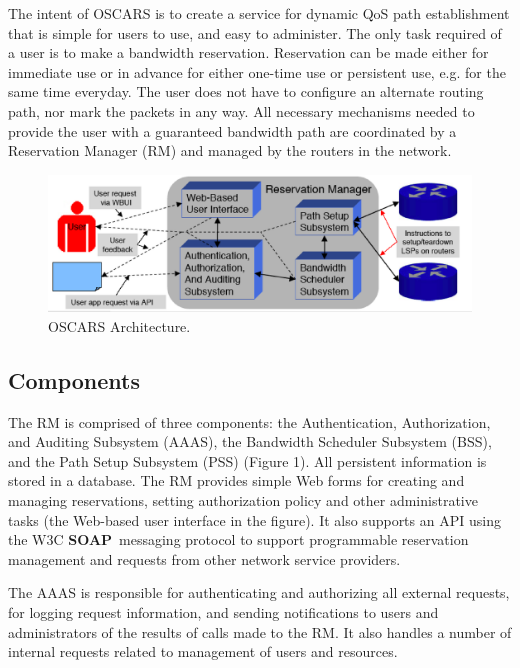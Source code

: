 \documentclass[conference]{IEEEtran}
\begin{document}
The intent of OSCARS is to create a service for dynamic QoS path establishment
that is simple for users to use, and easy to administer.  The only task 
required of a user is to make a bandwidth reservation.  Reservation can be made 
either for immediate use or in advance for either one-time use or persistent use, 
e.g. for the same time everyday. The user does not have 
to configure an alternate routing path, nor mark the packets in any way.  All 
necessary mechanisms needed to provide the user with a guaranteed bandwidth 
path are coordinated by a Reservation Manager (RM) and 
managed by the routers in the network.

\begin{figure}
 \centering 
   \includegraphics[scale=0.3]{pict1.eps}
   \caption{OSCARS Architecture.}
 \label{fig:oscars_arch}
\end{figure}

\subsection{Components}

The RM is comprised of three components:  the 
Authentication, Authorization, and Auditing Subsystem (AAAS), 
the Bandwidth Scheduler Subsystem (BSS), and the Path 
Setup Subsystem (PSS) (Figure 1). All persistent information is 
stored in a database.  
The RM provides simple Web forms for creating and managing reservations, 
setting authorization policy and other administrative tasks (the Web-based
user interface in the figure).
It also supports an API using the W3C \textbf{SOAP}\footnotemark~messaging protocol to support programmable 
reservation management and requests from other network service providers.


The AAAS is responsible for authenticating and authorizing all external 
requests, for logging request information, and sending notifications to
users and administrators of the results of calls made to the RM.  It also
handles a number of internal requests related to management of users 
and resources.
\end{document}
